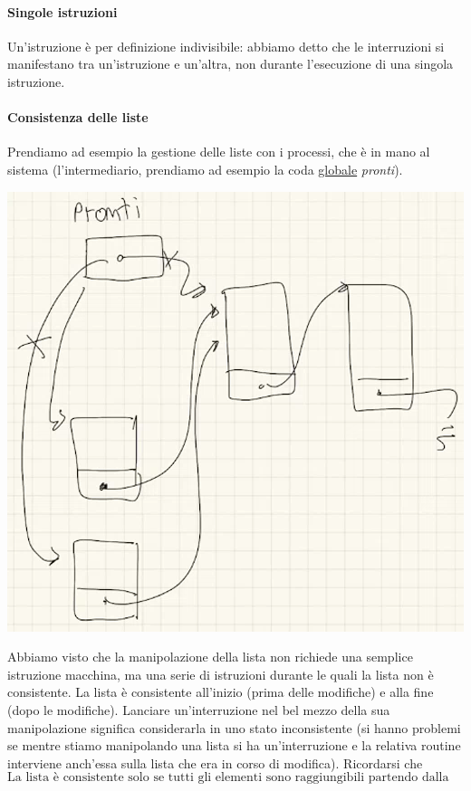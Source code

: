\documentclass[11pt]{report}
\theoremstyle{definition}
\begin{document}
\paragraph{Singole istruzioni} Un'istruzione è per definizione indivisibile: abbiamo detto che le interruzioni si manifestano tra un'istruzione e un'altra, non durante l'esecuzione di una singola istruzione.
\paragraph{Consistenza delle liste} Prendiamo ad esempio la gestione delle liste con i processi, che è in mano al sistema (l'intermediario, prendiamo ad esempio la coda \underline{globale} \emph{pronti}). 
\begin{center}\includegraphics[scale=.65]{img/129.PNG}\end{center}
Abbiamo visto che la manipolazione della lista non richiede una semplice istruzione macchina, ma una serie di istruzioni durante le quali la lista non è consistente. La lista è consistente all'inizio (prima delle modifiche) e alla fine (dopo le modifiche). Lanciare un'interruzione nel bel mezzo della sua manipolazione significa considerarla in uno stato inconsistente (si hanno problemi se mentre stiamo manipolando una lista si ha un'interruzione e la relativa routine interviene anch'essa sulla lista che era in corso di modifica).  Ricordarsi che
\[\boxed{\text{La lista è consistente solo se tutti gli elementi sono raggiungibili partendo dalla testa}}\]
\end{document}
